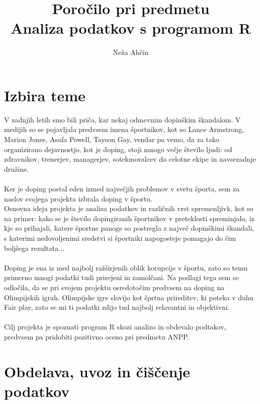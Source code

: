 \documentclass[11pt,a4paper]{article}
\begin{document}
\title{Poročilo pri predmetu \\
Analiza podatkov s programom R}
\author{Neža Ahčin}
\maketitle
\newpage
\section{Izbira teme}

V zadnjih letih smo bili priča, kar nekaj odmevnim dopinškim škandalom. V medijih so se pojavljala predvsem imena športnikov, kot so Lance Armstrong, Marion Jones, Asafa Powell, Tayson Gay, vendar pa vemo, da za tako organizirano dejavnostjo, kot je doping, stoji mnogo večje število ljudi: od zdravnikov, trenerjev, managerjev, sotekmovalcev do celotne ekipe in navsezadnje družine.
\
\\
\\
Ker je doping postal eden izmed največjih problemov v svetu športa, sem za naslov svojega projekta izbrala doping v športu.
\newline
\\
Osnovna ideja projekta je analiza podatkov in različnih vrst spremenljivk, kot so na primer: kako se je število dopingiranih športnikov v preteklosti spreminjalo, iz kje so prihajali, katere športne panoge so postregla z največ dopinškimi škandali, s katerimi nedovoljenimi sredstvi si športniki napogosteje pomagajo do čim boljšega rezultata...
\
\\
\\
Doping je ena iz med najbolj ražširjenih oblik korupcije v športu, zato so temu primerno mnogi podatki tudi prirejeni in zamolčani. Na podlagi tega sem se odločila, da se pri svojem projektu osredotočim predvsem na doping na Olimpijskih igrah. Olimpijske igre slovijo kot šprtna prireditev, ki poteka v duhu Fair play, zato se mi ti podatki zdijo tud najbolj relavantni in objektivni.
\
\\
\\
Cilj projekta je spoznati program R skozi analizo in obdevalo podtakov, predvsem pa pridobiti pozitivno oceno pri predmetu ANPP.

\newpage

\section{Obdelava, uvoz in čiščenje podatkov}
\end{document}
